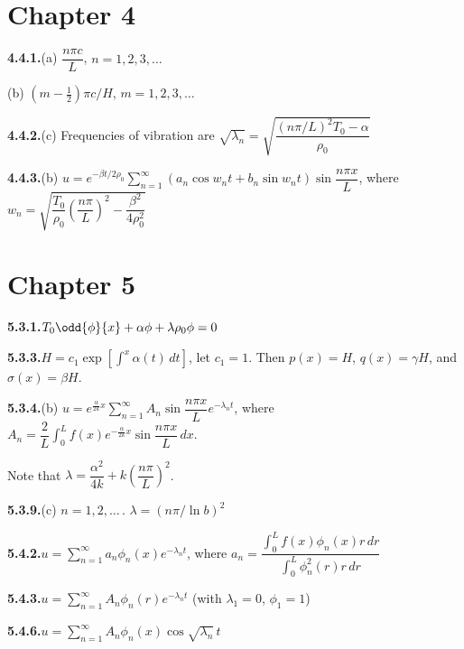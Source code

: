 \section*{Chapter 4}

\textbf{4.4.1.}\quad (a) $\dfrac{n\pi c}{L}$, $n = 1, 2, 3, \ldots$

\quad (b) $(m - \frac{1}{2})\pi c/H$, $m = 1, 2, 3, \ldots$

\medskip
\textbf{4.4.2.}\quad (c) Frequencies of vibration are $\sqrt{\lambda_n} = \sqrt{\dfrac{(n\pi/L)^2 T_0 - \alpha}{\rho_0}}$

\medskip
\textbf{4.4.3.}\quad (b) $u = e^{-\beta t/2\rho_0}\sum_{n=1}^{\infty}(a_n\cos w_n t + b_n\sin w_n t)\sin\dfrac{n\pi x}{L}$, where
$w_n = \sqrt{\dfrac{T_0}{\rho_0}\left(\dfrac{n\pi}{L}\right)^2 - \dfrac{\beta^2}{4\rho_0^2}}$

\section*{Chapter 5}

\textbf{5.3.1.}\quad $T_0\odd{\phi}{x} + \alpha\phi + \lambda\rho_0\phi = 0$

\medskip
\textbf{5.3.3.}\quad $H = c_1\exp\!\left[\int^x \alpha(t)\,dt\right]$, let $c_1 = 1$. Then $p(x) = H$, $q(x) = \gamma H$, and $\sigma(x) = \beta H$.

\medskip
\textbf{5.3.4.}\quad (b) $u = e^{\frac{\alpha}{2k}x}\sum_{n=1}^{\infty} A_n\sin\dfrac{n\pi x}{L}e^{-\lambda_n t}$, where $A_n = \dfrac{2}{L}\int_0^L f(x)e^{-\frac{\alpha}{2k}x}\sin\dfrac{n\pi x}{L}\,dx$.

Note that $\lambda = \dfrac{\alpha^2}{4k} + k\left(\dfrac{n\pi}{L}\right)^2$.

\medskip
\textbf{5.3.9.}\quad (c) $n = 1, 2, \ldots$\,. $\lambda = (n\pi/\ln b)^2$

\medskip
\textbf{5.4.2.}\quad $u = \sum_{n=1}^{\infty} a_n\phi_n(x)e^{-\lambda_n t}$, where $a_n = \dfrac{\int_0^L f(x)\phi_n(x)r\,dr}{\int_0^L \phi_n^2(r)r\,dr}$

\medskip
\textbf{5.4.3.}\quad $u = \sum_{n=1}^{\infty} A_n\phi_n(r)e^{-\lambda_n t}$ (with $\lambda_1 = 0$, $\phi_1 = 1$)

\medskip
\textbf{5.4.6.}\quad $u = \sum_{n=1}^{\infty} A_n\phi_n(x)\cos\sqrt{\lambda_n}\,t$

